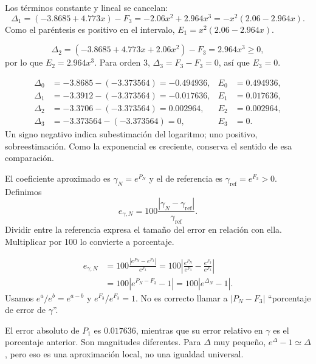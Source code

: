 Los términos constante y lineal se cancelan:
\[
\Delta_1=(-3.8685+4.773x)-F_3=-2.06x^2+2.964x^3=-x^2(2.06-2.964x).
\]
Como el paréntesis es positivo en el intervalo, $E_1=x^2(2.06-2.964x)$.

\[
\Delta_2=(-3.8685+4.773x+2.06x^2)-F_3=2.964x^3\geq0,
\]
por lo que $E_2=2.964x^3$. Para orden 3, $\Delta_3=F_3-F_3=0$, así que $E_3=0$.

\begin{align*}
\Delta_0&=-3.8685-(-3.373564)=-0.494936,&E_0&=0.494936,\\
\Delta_1&=-3.3912-(-3.373564)=-0.017636,&E_1&=0.017636,\\
\Delta_2&=-3.3706-(-3.373564)=0.002964,&E_2&=0.002964,\\
\Delta_3&=-3.373564-(-3.373564)=0,&E_3&=0.
\end{align*}
Un signo negativo indica subestimación del logaritmo; uno positivo, sobreestimación. Como la exponencial es creciente, conserva el sentido de esa comparación.

El coeficiente aproximado es $\gamma_N=e^{P_N}$ y el de referencia es $\gamma_{\mathrm{ref}}=e^{F_3}>0$. Definimos
\[
e_{\gamma,N}=100\frac{|\gamma_N-\gamma_{\mathrm{ref}}|}{\gamma_{\mathrm{ref}}}.
\]
Dividir entre la referencia expresa el tamaño del error en relación con ella. Multiplicar por 100 lo convierte a porcentaje.

\begin{align*}
e_{\gamma,N}
&=100\frac{|e^{P_N}-e^{F_3}|}{e^{F_3}}
=100\left|\frac{e^{P_N}}{e^{F_3}}-\frac{e^{F_3}}{e^{F_3}}\right|\\
&=100|e^{P_N-F_3}-1|=100|e^{\Delta_N}-1|.
\end{align*}
Usamos $e^a/e^b=e^{a-b}$ y $e^{F_3}/e^{F_3}=1$. No es correcto llamar a $|P_N-F_3|$ ``porcentaje de error de $\gamma$''.



El error absoluto de $P_1$ es $0.017636$, mientras que su error relativo en $\gamma$ es el porcentaje anterior. Son magnitudes diferentes. Para $\Delta$ muy pequeño, $e^\Delta-1\simeq\Delta$, pero eso es una aproximación local, no una igualdad universal.

